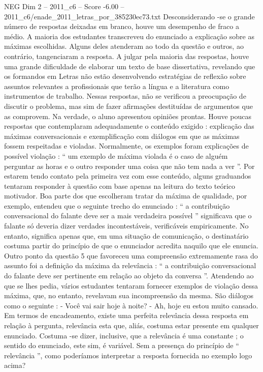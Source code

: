 \begin{textsample}{NEG Dim 2 – 2011\_c6 – Score -6.00 – 2011\_c6/enade\_2011\_letras\_por\_385230ec73.txt}
Desconsiderando -se o grande número de respostas deixadas em branco, houve um desempenho de fraco a médio.
A maioria dos estudantes transcreveu do enunciado a explicação sobre as máximas escolhidas.
Alguns deles atenderam ao todo da questão e outros, ao contrário, tangenciaram a resposta.
A julgar pela maioria das respostas, houve uma grande dificuldade de elaborar um texto de base dissertativa, revelando que os formandos em Letras não estão desenvolvendo estratégias de reflexão sobre assuntos relevantes a profissionais que terão a língua e a literatura como instrumentos de trabalho.
Nessas respostas, não se verificou a preocupação de discutir o problema, mas sim de fazer afirmações destituídas de argumentos que as comprovem.
Na verdade, o aluno apresentou opiniões prontas.
Houve poucas respostas que contemplaram adequadamente o conteúdo exigido : explicação das máximas conversacionais e exemplificação com diálogos em que as máximas fossem respeitadas e violadas.
Normalmente, os exemplos foram explicações de possível violação : “ um exemplo de máxima violada é o caso de alguém perguntar as horas e o outro responder uma coisa que não tem nada a ver ”.
Por estarem tendo contato pela primeira vez com esse conteúdo, alguns graduandos tentaram responder à questão com base apenas na leitura do texto teórico motivador.
Boa parte dos que escolheram tratar da máxima de qualidade, por exemplo, entendeu que o seguinte trecho do enunciado : “ a contribuição conversacional do falante deve ser a mais verdadeira possível ” significava que o falante só deveria dizer verdades incontestáveis, verificáveis empiricamente.
No entanto, significa apenas que, em uma situação de comunicação, o destinatário costuma partir do princípio de que o enunciador acredita naquilo que ele enuncia.
Outro ponto da questão 5 que favoreceu uma compreensão extremamente rasa do assunto foi a definição da máxima da relevância : “ a contribuição conversacional do falante deve ser pertinente em relação ao objeto da conversa ”.
Atendendo ao que se lhes pedia, vários estudantes tentaram fornecer exemplos de violação dessa máxima, que, no entanto, revelavam sua incompreensão da mesma.
São diálogos como o seguinte : - Você vai sair hoje à noite? - Ah, hoje eu estou muito cansado.
Em termos de encadeamento, existe uma perfeita relevância dessa resposta em relação à pergunta, relevância esta que, aliás, costuma estar presente em qualquer enunciado.
Costuma -se dizer, inclusive, que a relevância é uma constante ; o sentido do enunciado, este sim, é variável.
Sem a presença do princípio de “ relevância ”, como poderíamos interpretar a resposta fornecida no exemplo logo acima?

\end{textsample}
